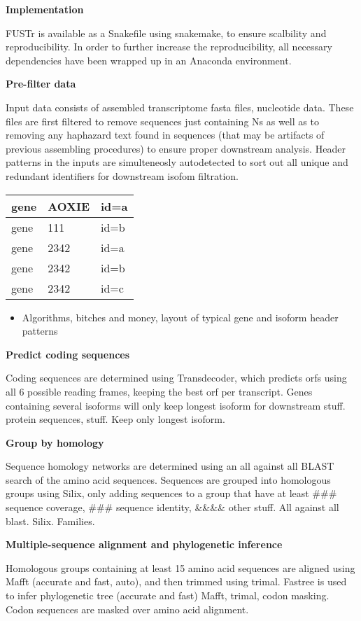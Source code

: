 \documentclass[]{article}
\begin{document}
\textbf{Implementation}

FUSTr is available as a Snakefile using snakemake, to ensure scalbility
and reproducibility. In order to further increase the reproducibility,
all necessary dependencies have been wrapped up in an Anaconda
environment. ~

\textbf{Pre-filter data}

Input data consists of assembled transcriptome fasta files, nucleotide
data. These files are first filtered to remove sequences just containing
Ns as well as to removing any haphazard text found in sequences (that
may be artifacts of previous assembling procedures) to ensure proper
downstream analysis. Header patterns in the inputs are simulteneosly
autodetected to sort out all unique and redundant identifiers for
downstream isofom filtration.

\begin{longtable}[]{@{}lll@{}}
\toprule
gene & AOXIE & id=a\tabularnewline
\midrule
\endhead
gene & 111 & id=b\tabularnewline
gene & 2342 & id=a\tabularnewline
gene & 2342 & id=b\tabularnewline
gene & 2342 & id=c\tabularnewline
\bottomrule
\end{longtable}

\begin{itemize}
\item
  Algorithms, bitches and money, layout of typical gene and isoform
  header patterns
\end{itemize}

\textbf{Predict coding sequences}

Coding sequences are determined using Transdecoder, which predicts orfs
using all 6 possible reading frames, keeping the best orf per
transcript. Genes containing several isoforms will only keep longest
isoform for downstream stuff. protein sequences, stuff. Keep only
longest isoform.

\textbf{Group by homology}

Sequence homology networks are determined using an all against all BLAST
search of the amino acid sequences. Sequences are grouped into
homologous groups using Silix, only adding sequences to a group that
have at least \#\#\# sequence coverage, \#\#\# sequence identity,
\&\&\&\& other stuff. All against all blast. Silix. Families.

\textbf{Multiple-sequence alignment and phylogenetic inference}

Homologous groups containing at least 15 amino acid sequences are
aligned using Mafft (accurate and fast, auto), and then trimmed using
trimal. Fastree is used to infer phylogenetic tree (accurate and fast)
Mafft, trimal, codon masking. Codon sequences are masked over amino acid
alignment.
\end{document}
